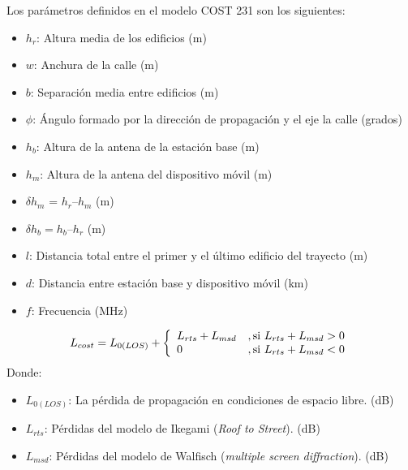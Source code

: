 \documentclass[
	12pt, %
	fleqn, %
	a4paper, %
	oneside, %
]{LegrandOrangeBook}
\begin{document}
Los parámetros definidos en el modelo COST 231 son los siguientes:
\begin{itemize}
\item $h_r$: Altura media de los edificios (m)
\item $w$: Anchura de la calle (m)
\item $b$: Separación media entre edificios (m)
\item $\phi$: Ángulo formado por la dirección de propagación y el eje la calle (grados)
\item $h_b$: Altura de la antena de la estación base (m)
\item $h_m$: Altura de la antena del dispositivo móvil (m)
\item $\delta h_m$ = $h_r – h_m$ (m)
\item $\delta h_b = h_b – h_r$ (m)
\item $l$: Distancia total entre el primer y el último edificio del trayecto (m)
\item $d$: Distancia entre estación base y dispositivo móvil (km)
\item $f$: Frecuencia (MHz)
\end{itemize}
\begin{equation}
L_{cost} =L_{0(LOS)}+ \left\lbrace
\begin{array}{ll}
L_{rts}+L_{msd}&, \textup{si }L_{rts}+L_{msd} > 0\\
0 & , \textup{si }L_{rts}+L_{msd} < 0
\end{array}
\right.
\end{equation}
Donde:
\begin{itemize}
\item $L_{0(LOS)}$: La pérdida de propagación en condiciones de espacio libre. (dB)
\item $L_{rts}$: Pérdidas del modelo de Ikegami (\textit{Roof to Street}). (dB)
\item $L_{msd}$: Pérdidas del modelo de Walfisch (\textit{multiple screen diffraction}). (dB)
\end{itemize}
\end{document}
